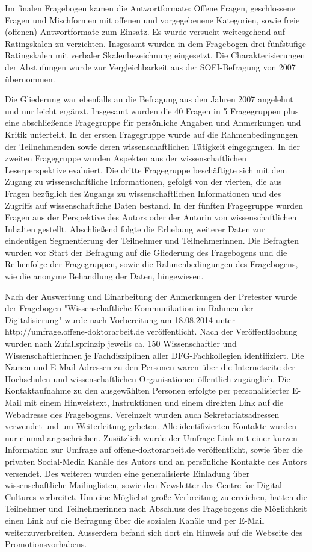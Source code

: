 Im finalen Fragebogen kamen die Antwortformate: Offene Fragen, geschlossene Fragen und Mischformen mit offenen und vorgegebenene Kategorien, sowie freie (offenen) Antwortformate zum Einsatz. Es wurde versucht weitesgehend auf Ratingskalen zu verzichten. Insgesamt wurden in dem Fragebogen drei fünfstufige Ratingskalen mit verbaler Skalenbezeichnung eingesetzt. Die Charakterisierungen der Abstufungen wurde zur Vergleichbarkeit aus der SOFI-Befragung von 2007 übernommen.

Die Gliederung war ebenfalls an die Befragung aus den Jahren 2007 angelehnt und nur leicht ergänzt. Insgesamt wurden die 40 Fragen in 5 Fragegruppen plus eine abschließende Fragegruppe für persönliche Angaben und Anmerkungen und Kritik unterteilt. In der ersten Fragegruppe wurde auf die Rahmenbedingungen der Teilnehmenden sowie deren wissenschaftlichen Tätigkeit eingegangen. In der zweiten Fragegruppe wurden Aspekten aus der wissenschaftlichen Leserperspektive evaluiert. Die dritte Fragegruppe beschäftigte sich mit dem Zugang zu wissenschaftliche Informationen, gefolgt von der vierten, die aus Fragen bezüglich des Zugangs zu wissenschaftlichen Informationen und des Zugriffs auf wissenschaftliche Daten bestand. In der fünften Fragegruppe wurden Fragen aus der Perspektive des Autors oder der Autorin von wissenschaftlichen Inhalten gestellt. Abschließend folgte die Erhebung weiterer Daten zur eindeutigen Segmentierung der Teilnehmer und Teilnehmerinnen. Die Befragten wurden vor Start der Befragung auf die Gliederung des Fragebogens und die Reihenfolge der Fragegruppen, sowie die Rahmenbedingungen des Fragebogens, wie die anonyme Behandlung der Daten, hingewiesen.

Nach der Auswertung und Einarbeitung der Anmerkungen der Pretester wurde der Fragebogen "Wissenschaftliche Kommunikation im Rahmen der Digitalisierung" wurde nach Vorbereitung am 18.08.2014 unter http://umfrage.offene-doktorarbeit.de veröffentlicht. Nach der Veröffentlochung wurden nach Zufallsprinzip jeweils ca. 150 Wissenschaftler und Wissenschaftlerinnen je Fachdisziplinen aller DFG-Fachkollegien identifiziert. Die Namen und E-Mail-Adressen zu den Personen waren über die Internetseite der Hochschulen und wissenschaftlichen Organisationen öffentlich zugänglich. Die Kontaktaufnahme zu den ausgewählten Personen erfolgte per personalisierter E-Mail mit einem Hinweistext, Instruktionen und einem direkten Link auf die Webadresse des Fragebogens. Vereinzelt wurden auch Sekretariatsadressen verwendet und um Weiterleitung gebeten. Alle identifizierten Kontakte wurden nur einmal angeschrieben. Zusätzlich wurde der Umfrage-Link mit einer kurzen Information zur Umfrage auf offene-doktorarbeit.de veröffentlicht, sowie über die privaten Social-Media Kanäle des Autors und an persönliche Kontakte des Autors versendet. Des weiteren wurden eine generalisierte Einladung über wissenschaftliche Mailinglisten, sowie den Newsletter des Centre for Digital Cultures verbreitet. Um eine Möglichst große Verbreitung zu erreichen, hatten die Teilnehmer und Teilnehmerinnen nach Abschluss des Fragebogens die Möglichkeit einen Link auf die Befragung  über die sozialen Kanäle und per E-Mail weiterzuverbreiten. Ausserdem befand sich dort ein Hinweis auf die Webseite des Promotionsvorhabens.

